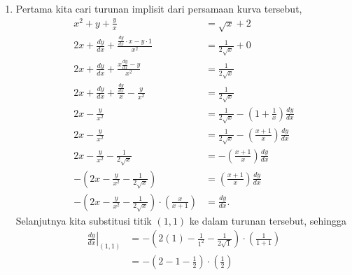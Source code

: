 \documentclass[11pt,openany,a4paper]{article}
\begin{document}
\begin{enumerate}
    \item Pertama kita cari turunan implisit dari persamaan kurva tersebut,
          \begin{align*}
              x^2 + y + \frac{y}{x}                                                                     & = \sqrt{x} + 2                                                     \\
              2x + \frac{dy}{dx} + \frac{\frac{dy}{dx} \cdot x - y \cdot 1}{x^2}                        & = \frac{1}{2\sqrt{x}} + 0                                          \\
              2x + \frac{dy}{dx} + \frac{x \frac{dy}{dx} - y}{x^2}                                      & = \frac{1}{2\sqrt{x}}                                              \\
              2x + \frac{dy}{dx} + \frac{\frac{dy}{dx}}{x} - \frac{y}{x^2}                              & = \frac{1}{2\sqrt{x}}                                              \\
              2x - \frac{y}{x^2}                                                                        & = \frac{1}{2\sqrt{x}} - \left(1 + \frac{1}{x}\right) \frac{dy}{dx} \\
              2x - \frac{y}{x^2}                                                                        & = \frac{1}{2\sqrt{x}} - \left(\frac{x + 1}{x}\right) \frac{dy}{dx} \\
              2x - \frac{y}{x^2} - \frac{1}{2\sqrt{x}}                                                  & = -\left(\frac{x + 1}{x}\right) \frac{dy}{dx}                      \\
              -\left(2x - \frac{y}{x^2} - \frac{1}{2\sqrt{x}}\right)                                    & = \left(\frac{x + 1}{x}\right) \frac{dy}{dx}                       \\
              -\left(2x - \frac{y}{x^2} - \frac{1}{2\sqrt{x}}\right) \cdot \left(\frac{x}{x + 1}\right) & = \frac{dy}{dx}.
          \end{align*}
          Selanjutnya kita substitusi titik $(1,1)$ ke dalam turunan tersebut, sehingga
          \begin{align*}
              \left. \frac{dy}{dx} \right|_{(1,1)} & = -\left(2(1) - \frac{1}{1^2} - \frac{1}{2\sqrt{1}}\right) \cdot \left(\frac{1}{1 + 1}\right) \\
                                                   & = -\left(2 - 1 - \frac{1}{2}\right) \cdot \left(\frac{1}{2}\right)                            \\

\end{align*}
\end{enumerate}
\end{document}
